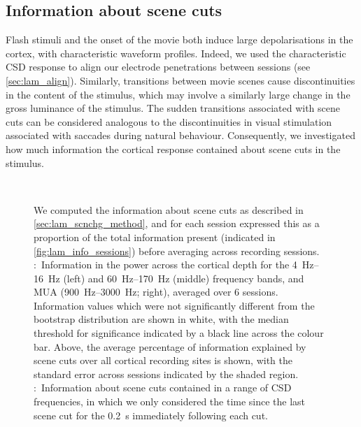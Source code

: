 \subsection{Information about scene cuts}
\label{sec:lam_scnchg}

Flash stimuli and the onset of the movie both induce large depolarisations in the cortex, with characteristic waveform profiles.
Indeed, we used the characteristic \ac{CSD} response to align our electrode penetrations between sessions (see \autoref{sec:lam_align}).
Similarly, transitions between movie scenes cause discontinuities in the content of the stimulus, which may involve a similarly large change in the gross luminance of the stimulus.
The sudden transitions associated with scene cuts can be considered analogous to the discontinuities in visual stimulation associated with saccades during natural behaviour.
Consequently, we investigated how much information the cortical response contained about scene cuts in the stimulus.

\begin{figure}[htbp]
\centering
{}
\\
%
\caption{
We computed the information about scene cuts as described in \autoref{sec:lam_scnchg_method}, and for each session expressed this as a proportion of the total information present (indicated in \autoref{fig:lam_info_sessions}) before averaging across recording sessions.
\protect{}:~Information in the power across the cortical depth for the \SIrange{4}{16}{Hz} (left) and \SIrange{60}{170}{Hz} (middle) frequency bands, and \ac{MUA} (\SIrange{900}{3000}{Hz}; right), averaged over \num{6} sessions.
Information values which were not significantly different from the bootstrap distribution are shown in white, with the median threshold for significance indicated by a black line across the colour bar.
Above, the average percentage of information explained by scene cuts over all cortical recording sites is shown, with the standard error across sessions indicated by the shaded region.
\protect{}:~Information about scene cuts contained in a range of \ac{CSD} frequencies, in which we only considered the time since the last scene cut for the \SI{0.2}{\second} immediately following each cut.
}%
\label{fig:lam_scnchg}
%
\end{figure}


